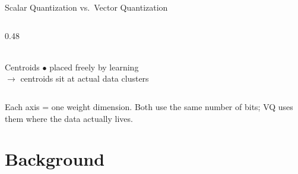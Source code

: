 \begin{frame}{Scalar Quantization vs.\ Vector Quantization}
\begin{columns}[T]
\begin{column}{0.48\textwidth}
\\[0.3em]
      \small Centroids \textcolor{mycolor}{$\bullet$} placed freely by learning\\
      \textcolor{mycolor!70!black}{$\rightarrow$ centroids sit at actual data clusters}
    \end{column}
  \end{columns}
  \vspace{0.2em}
  \centering\small
  Each axis = one weight dimension.\quad
  Both use the same number of bits; VQ uses them where the data actually lives.
\end{frame}

\section{Background}

